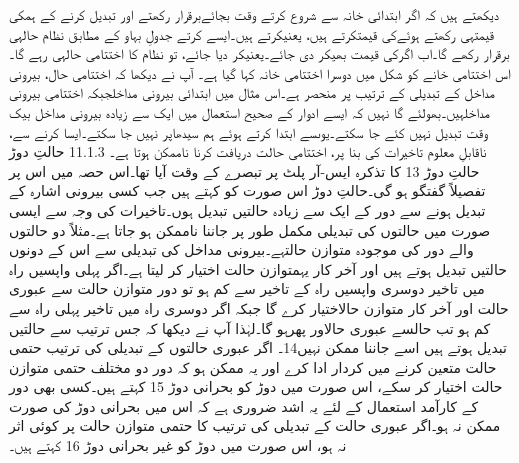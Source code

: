 	دیکھتے ہیں کہ اگر ابتدائی خانہ سے شروع کرتے وقت بجائےبرقرار رکھتے اور تبدیل کرنے کے ہمکی قیمتہی رکھتے ہوئےکی قیمتکرتے ہیں، یعنیکرتے ہیں۔ایسے کرتے جدولِ بہاو کے مطابق نظام حالہی برقرار رکھے گا۔اب اگرکی قیمت بھیکر دی جائے۔یعنیکر دیا جائے، تو نظام کا اختتامی حالہی رہے گا۔اس اختتامی خانے کو شکل میں دوسرا اختتامی خانہ کہا گیا ہے۔
	آپ نے دیکھا کہ اختتامی حال، بیرونی مداخل کے تبدیلی کے ترتیب پر منحصر ہے۔اس مثال میں ابتدائی بیرونی مداخلجبکہ اختتامی بیرونی مداخلہیں۔بھولئے گا نہیں کہ ایسے ادوار کے صحیح استعمال میں ایک سے زیادہ بیرونی مداخل بیک وقت تبدیل نہیں کئے جا سکتے۔یوںسے ابتدا کرتے ہوئے ہم سیدھاپر نہیں جا سکتے۔ایسا کرنے سے، ناقابلِ معلوم تاخیرات کی بنا پر، اختتامی حالت دریافت کرنا ناممکن ہوتا ہے۔
11.1.3 حالتِ دوڑ
	حالتِ دوڑ 13 کا تذکرہ ایس-آر پلٹ پر تبصرے کے وقت آیا تھا۔اس حصہ میں اس پر تفصیلاً گفتگو ہو گی۔حالتِ دوڑ اس صورت کو کہتے ہیں جب کسی بیرونی اشارہ کے تبدیل ہونے سے دور کے ایک سے زیادہ حالتیں تبدیل ہوں۔تاخیرات کی وجہ سے ایسی صورت میں حالتوں کی تبدیلی مکمل طور پر جاننا ناممکن ہو جاتا ہے۔مثلاً دو حالتوں والے دور کی موجودہ متوازن حالتہے۔بیرونی مداخل کی تبدیلی  سے اس کے دونوں حالتیں تبدیل ہوتے ہیں اور آخر کار یہمتوازن حالت اختیار کر لیتا ہے۔اگر پہلی واپسیں راہ میں تاخیر دوسری واپسیں راہ کے تاخیر سے کم ہو تو دور متوازن حالت سے عبوری حالت اور آخر کار متوازن حالاختیار کرے گا جبکہ اگر دوسری راہ میں تاخیر پہلی راہ سے کم ہو تب حالسے عبوری حالاور پھرہو گا۔لہٰذا آپ نے دیکھا کہ جس ترتیب سے حالتیں تبدیل ہوتے ہیں اسے جاننا ممکن نہیں14۔
	اگر عبوری حالتوں کے تبدیلی کی ترتیب حتمی حالت متعین کرنے میں کردار ادا کرے اور یہ ممکن ہو کہ دور دو مختلف حتمی متوازن حالت اختیار کر سکے، اس صورت میں دوڑ کو بحرانی دوڑ 15 کہتے ہیں۔کسی بھی دور کے کارآمد استعمال کے لئے یہ اشد ضروری ہے کہ اس میں بحرانی دوڑ کی صورت ممکن نہ ہو۔اگر عبوری حالت کے تبدیلی کی ترتیب کا حتمی متوازن حالت پر کوئی اثر نہ ہو، اس صورت میں دوڑ کو غیر بحرانی دوڑ 16 کہتے ہیں۔



